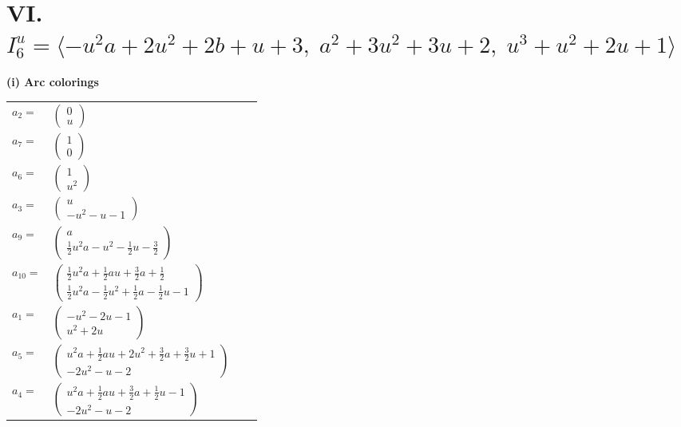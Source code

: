 \documentclass[1p]{elsarticle_modified}
\theoremstyle{definition}
\begin{document}
\centering \section*{VI. $I^u_{6}= \langle - u^2 a+2 u^2+2 b+u+3,\;a^2+3 u^2+3 u+2,\;u^3+u^2+2 u+1 \rangle$}
\flushleft \textbf{(i) Arc colorings}\\
\begin{tabular}{m{7pt} m{180pt} m{7pt} m{180pt} }
\flushright $a_{2}=$&$\begin{pmatrix}0\\u\end{pmatrix}$ \\
\flushright $a_{7}=$&$\begin{pmatrix}1\\0\end{pmatrix}$ \\
\flushright $a_{6}=$&$\begin{pmatrix}1\\u^2\end{pmatrix}$ \\
\flushright $a_{3}=$&$\begin{pmatrix}u\\- u^2- u-1\end{pmatrix}$ \\
\flushright $a_{9}=$&$\begin{pmatrix}a\\\frac{1}{2} u^2 a- u^2-\frac{1}{2} u-\frac{3}{2}\end{pmatrix}$ \\
\flushright $a_{10}=$&$\begin{pmatrix}\frac{1}{2} u^2 a+\frac{1}{2} a u+\frac{3}{2} a+\frac{1}{2}\\\frac{1}{2} u^2 a-\frac{1}{2} u^2+\frac{1}{2} a-\frac{1}{2} u-1\end{pmatrix}$ \\
\flushright $a_{1}=$&$\begin{pmatrix}- u^2-2 u-1\\u^2+2 u\end{pmatrix}$ \\
\flushright $a_{5}=$&$\begin{pmatrix}u^2 a+\frac{1}{2} a u+2 u^2+\frac{3}{2} a+\frac{3}{2} u+1\\-2 u^2- u-2\end{pmatrix}$ \\
\flushright $a_{4}=$&$\begin{pmatrix}u^2 a+\frac{1}{2} a u+\frac{3}{2} a+\frac{1}{2} u-1\\-2 u^2- u-2\end{pmatrix}$ \\

\end{tabular}
\end{document}
